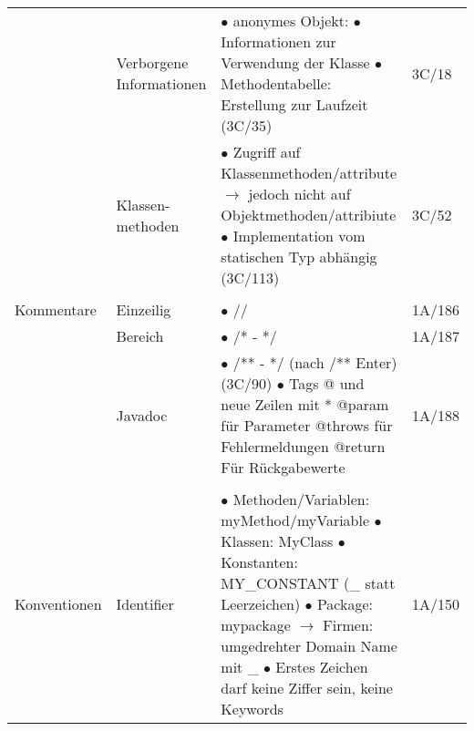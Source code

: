 \documentclass[11pt,a4paper]{article}
\begin{document}
\begin{center}
\begin{longtable}[h]{ | p{2.3cm} | p{2.3cm} | p{12.6cm} | p{1.2cm} | }
	& \makecell[l]{Verborgene \\ Informationen} & \makecell[l]{$\bullet$ anonymes Objekt: \\ 
	\hspace{0.4cm} $\bullet$Informationen zur Verwendung der Klasse \\ 
	\hspace{0.4cm} $\bullet$ Methodentabelle: Erstellung zur Laufzeit (3C/35)}  & 3C/18 \\ \cline{2-4}
	
	& \makecell[l]{Klassen- \\ methoden} & \makecell[l]{$\bullet$ Zugriff auf Klassenmethoden/attribute \\ 
	\hspace{0.4cm} $\rightarrow$ jedoch nicht auf Objektmethoden/attribiute \\ 
	$\bullet$ Implementation vom statischen Typ abhängig (3C/113)} & 3C/52 \\ 
	\hline
	

	
	\multicolumn{3}{c}{} \\ 
	\hline 	
    
    
    
	{\large Kommentare} & Einzeilig & $\bullet$ // & 1A/186 \\ \cline{2-4}
	
	& Bereich & $\bullet$ /* - */ & 1A/187 \\ \cline{2-4}
	
	& Javadoc & \makecell[l]{$\bullet$ /** - */ (nach /** Enter) (3C/90)\\ $\bullet$ Tags @ und neue Zeilen mit * \\
	@param für Parameter \\ @throws für Fehlermeldungen \\ @return Für Rückgabewerte} & 1A/188 \\ 
	\hline
	
	
	
	\multicolumn{3}{c}{} \\ 
	\hline  
	
	
	
	{\large Konventionen} & Identifier & \makecell[l]{$\bullet$ Methoden/Variablen: myMethod/myVariable \\ 
	$\bullet$ Klassen: MyClass \\ 
	$\bullet$ Konstanten: MY\_CONSTANT (\_ statt Leerzeichen)
	\\ $\bullet$ Package: mypackage \\ \hspace{0.4cm} $\rightarrow$ Firmen: umgedrehter Domain Name mit \_\\ 
	$\bullet$ Erstes Zeichen darf keine Ziffer sein, keine Keywords}  & 1A/150 \\ \cline{2-4}
	\hline
	

\end{longtable}
\end{center}
\end{document}
